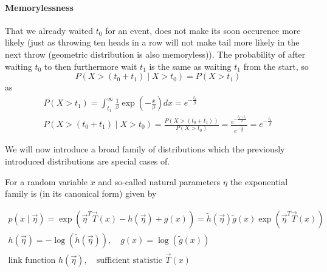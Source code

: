 \paragraph*{Memorylessness} That we already waited $t_0$ for an event, does not make
its soon occurence more likely (just as throwing ten heads in a row
will not make tail more likely in the next throw (geometric distribution is also
memoryless)). The probability of after waiting $t_0$ to then furthermore wait $t_1$ is
the same as waiting $t_1$ from the start, so
\begin{equation}
    P(X > (t_0 + t_1) \mid X > t_0) = P(X > t_1)
\end{equation}
as
\begin{equation}
    \begin{gathered}
    P\left(X>t_1\right)=\int_{t_1}^{\infty} \frac{1}{\beta} \exp \left(-\frac{x}{\beta}\right) d x=e^{-\frac{t_1}{\beta}} \\
    P\left(X>\left(t_0+t_1\right) \mid X>t_0\right)=\frac{P\left(X>\left(t_0+t_1\right)\right)}{P\left(X>t_0\right)}=\frac{e^{-\frac{t_0+t_1}{\beta}}}{e^{-\frac{t_0}{\beta}}}=e^{-\frac{t_1}{\beta}}
    \end{gathered}
\end{equation}

We will now introduce a broad family of distributions which the previously
introduced distributions are special cases of.

For a random variable $x$ and so-called natural parameters $\eta$ the exponential family
is (in its canonical form) given by

\begin{equation}
    \begin{gathered}
    p(x \mid \vec{\eta})=\exp \left(\vec{\eta}^T \vec{T}(x)-h(\vec{\eta})+g(x)\right)=\tilde{h}(\vec{\eta}) \tilde{g}(x) \exp \left(\vec{\eta}^T \vec{T}(x)\right) \\
    h(\vec{\eta})=-\log (\tilde{h}(\vec{\eta})), \quad g(x)=\log (\tilde{g}(x)) \\
    \text{link function } h(\vec{\eta}), \quad \text{sufficient statistic } \vec{T}(x)
    \end{gathered}
\end{equation}

